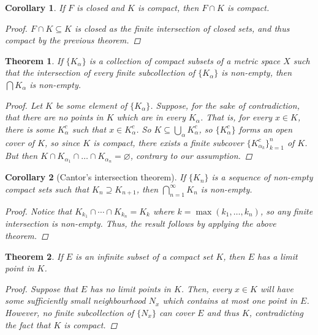 \documentclass{scrbook}
\let\emptyset\varnothing
\newtheorem{theorem}{Theorem}
\newtheorem{corollary}{Corollary}
\begin{document}
\begin{corollary}
If $F$ is closed and $K$ is compact, then $F \cap K$ is compact.

\begin{proof}
$F \cap K \subseteq K$ is closed as the finite intersection of closed sets, and thus compact by the previous theorem.
\end{proof}
\end{corollary}

\begin{theorem}
If $\{K_\alpha\}$ is a collection of compact subsets of a metric space $X$ such that the intersection of every finite subcollection of $\{K_\alpha\}$ is non-empty, then $\bigcap K_\alpha$ is non-empty. 

\begin{proof}
Let $K$ be some element of $\{K_\alpha\}$. Suppose, for the sake of contradiction, that there are no points in $K$ which are in every $K_\alpha$. That is, for every $x \in K$, there is some $K_\alpha^c$ such that $x \in K_\alpha^c$. So $K \subseteq \bigcup_\alpha K_\alpha^c$, so $\{K_\alpha^c\}$ forms an open cover of $K$, so since $K$ is compact, there exists a finite subcover $\{K_{\alpha_k}^c\}_{k=1}^{n}$ of $K$. But then $K \cap K_{\alpha_1} \cap \dotsc \cap K_{\alpha_n} = \emptyset$, contrary to our assumption.
\end{proof}
\end{theorem}

\begin{corollary}[Cantor's intersection theorem]
If $\{K_n\}$ is a sequence of non-empty compact sets such that $K_n \supseteq K_{n+1}$, then $\bigcap_{n=1}^{\infty} K_n$ is non-empty.

\begin{proof}
Notice that $K_{k_1} \cap \dotsb \cap K_{k_n} = K_k$ where $k = \max(k_1, \dotsc, k_n)$, so any finite intersection is non-empty. Thus, the result follows by applying the above theorem.
\end{proof}
\end{corollary}

\begin{theorem}
If $E$ is an infinite subset of a compact set $K$, then $E$ has a limit point in $K$.

\begin{proof}
Suppose that $E$ has no limit points in $K$. Then, every $x \in K$ will have some sufficiently small neighbourhood $N_x$ which contains at most one point in $E$. However, no finite subcollection of $\{N_x\}$ can cover $E$ and thus $K$, contradicting the fact that $K$ is compact.
\end{proof}
\end{theorem}
\end{document}
